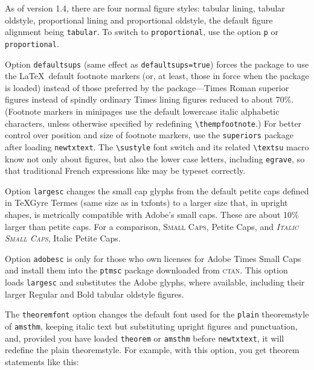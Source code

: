 \documentclass[11pt]{article}
\theoremstyle{oldplain}
\theoremstyle{plain}
\begin{document}
As of version 1.4, there are four normal figure styles: tabular lining, tabular oldstyle, proportional lining and proportional oldstyle, the default figure alignment being \texttt{tabular}. To switch to \texttt{proportional}, use the option \texttt{p} or \texttt{proportional}.

Option {\tt defaultsups} (same effect as {\tt defaultsups=true}) forces the package to use the \LaTeX\ default footnote markers (or, at least, those in force when the package is loaded) instead of those preferred by the package---Times Roman superior figures instead of spindly ordinary Times lining figures reduced to about 70\%. (Footnote markers in minipages use the default lowercase italic alphabetic characters, unless otherwise specified by redefining \verb|\thempfootnote|.) For better control over position and size of footnote markers, use the {\tt superiors} package after loading {\tt newtxtext}. The \verb|\sustyle| font switch and its related \verb|\textsu| macro know not only about figures, but also the lower case letters, including \texttt{egrave}, so that traditional French expressions like  may be typeset correctly.

Option \texttt{largesc} changes the small cap glyphs from the default petite caps defined in TeXGyre Termes (same size as in txfonts) to a larger size that, in upright shapes, is metrically compatible with Adobe's small caps. These are about 10\% larger than petite caps. For a comparison, \textsc{Small Caps}, {Petite Caps}, and \textsc{\textit{Italic Small Caps}}, {Italic Petite Caps}.

Option \texttt{adobesc} is only for those who own licenses for \textsf{Adobe Times Small Caps} and install them into the \texttt{ptmsc} package downloaded from \textsc{ctan}. This option loads \texttt{largesc} and substitutes the Adobe glyphs, where available, including their larger Regular and Bold tabular oldstyle figures.

The {\tt theoremfont} option changes the default font used for the {\tt plain} theoremstyle of {\tt amsthm}, keeping italic text but substituting upright figures and punctuation, and, provided you have loaded {\tt theorem} or {\tt amsthm} before {\tt newtxtext}, it will redefine the plain theoremstyle.  For example, with this option, you get theorem statements like this:
\end{document}
